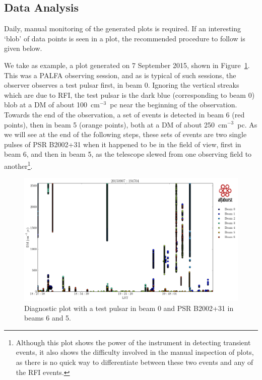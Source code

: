 \documentclass{article}
\begin{document}
\subsection{Data Analysis}

Daily, manual monitoring of the generated plots is required. If an interesting
`blob' of data points is seen in a plot, the recommended procedure to follow is
given below.

We take as example, a plot generated on 7 September 2015, shown in
Figure~\ref{fig_dmvst}. This was a PALFA observing session, and as is typical
of such sessions, the observer observes a test pulsar first, in beam 0.
Ignoring the vertical streaks which are due to RFI, the test pulsar is the dark
blue (corresponding to beam 0) blob at a DM of about 100~cm$^{-3}$~pc near the
beginning of the observation. Towards the end of the observation, a set of
events is detected in beam 6 (red points), then in beam 5 (orange points), both
at a DM of about 250~cm$^{-3}$~pc. As we will see at the end of the following
steps, these sets of events are two single pulses of PSR B2002+31 when it
happened to be in the field of view, first in beam 6, and then in beam 5, as
the telescope slewed from one observing field to another\footnote{Although this
plot shows the power of the instrument in detecting transient events, it also
shows the difficulty involved in the manual inspection of plots, as there is no
quick way to differentiate between these two events and any of the RFI
events.}.

\begin{figure}[h]
\includegraphics[width=\textwidth]{AllBeams_D20150907T194704.png}
\caption{Diagnostic plot with a test pulsar in beam 0 and PSR B2002+31 in beams
    6 and 5.\label{fig_dmvst}}
\end{figure}
\end{document}
